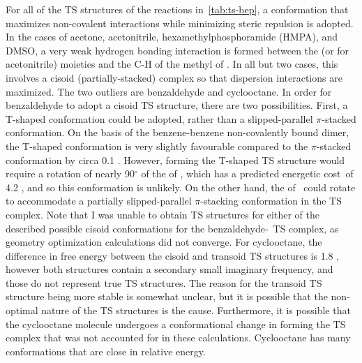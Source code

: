 For all of the TS structures of the reactions in~\ref{tab:ts-bep}, a
conformation that maximizes non-covalent interactions while minimizing steric
repulsion is adopted. In the cases of acetone, acetonitrile,
hexamethylphosphoramide (HMPA), and DMSO, a very weak hydrogen bonding
interaction is formed between the  (or  for acetonitrile)
moieties and the C-H of the methyl of \cumo. In all but two cases, this involves
a cisoid (partially-stacked) complex so that dispersion interactions are
maximized. The two outliers are benzaldehyde and cyclooctane. In order for
benzaldehyde to adopt a cisoid TS structure, there are two possibilities. First,
a T-shaped conformation could be adopted, rather than a slipped-parallel
$\pi$-stacked conformation. On the basis of the benzene-benzene non-covalently
bound dimer,\cite{Sinnokrot2002} the T-shaped conformation is very slightly
favourable compared to the $\pi$-stacked conformation by circa 0.1 \kcalmol.
However, forming the T-shaped TS structure would require a rotation of nearly
90$^\circ$ of the  of \cumo, which has a predicted energetic
cost\footnotemark\ of 4.2 \kcalmol, and so this conformation is unlikely. On the
other hand, the  of \cumo\ could rotate to accommodate a
partially slipped-parallel $\pi$-stacking conformation in the TS complex. Note
that I was unable to obtain TS structures for either of the described possible
cisoid conformations for the benzaldehyde-\cumo\ TS complex, as geometry
optimization calculations did not converge. For cyclooctane, the difference in
free energy between the cisoid and transoid TS structures is 1.8 \kcalmol,
however both structures contain a secondary small imaginary frequency, and those
do not represent true TS structures. The reason for the transoid TS structure
being more stable is somewhat unclear, but it is possible that the non-optimal
nature of the TS structures is the cause. Furthermore, it is possible that the
cyclooctane molecule undergoes a conformational change in forming the TS complex
that was not accounted for in these calculations. Cyclooctane has many
conformations that are close in relative energy.\cite{Dorofeeva1985}


